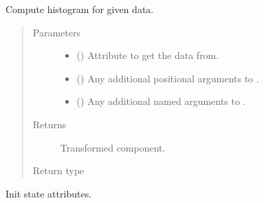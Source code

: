 \documentclass[letterpaper,10pt,english]{sphinxmanual}
\begin{document}
\begin{fulllineitems}
\begin{fulllineitems}
\label{\detokenize{api/states:geology.src.States.histogram}}
Compute histogram for given data.
\begin{quote}\begin{description}
\item[{Parameters}] \leavevmode\begin{itemize}
\item {} 
 (\sphinxstyleliteralemphasis{\sphinxupquote{, }}) \textendash{} Attribute to get the data from.

\item {} 
 () \textendash{} Any additional positional arguments to .

\item {} 
 () \textendash{} Any additional named arguments to .

\end{itemize}

\item[{Returns}] \leavevmode
{} \textendash{} Transformed component.

\item[{Return type}] \leavevmode
{\hyperref[\detokenize{api/base_classes:geology.src.base_spatial.SpatialComponent}]{}}

\end{description}\end{quote}

\end{fulllineitems}


\begin{fulllineitems}
\label{\detokenize{api/states:geology.src.States.init_state}}
Init state attributes.


\end{fulllineitems}
\end{fulllineitems}
\end{document}
